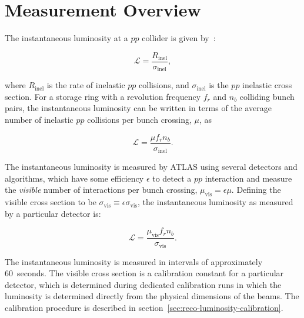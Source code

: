 
\section{Measurement Overview}\label{sec:luminosity-overview}
The instantaneous luminosity at a $pp$ collider is given by~\cite{Grafstrom:2015go,Aad:2013ucp}:

\begin{equation}
	\mathcal{L} = \frac{R_{\mathrm{inel}}}{\sigma_{\mathrm{inel}}},
\end{equation}

where $R_{\mathrm{inel}}$ is the rate of inelastic $pp$ collisions, and $\sigma_{\mathrm{inel}}$ is the $pp$ inelastic cross section. For a storage ring with a revolution frequency $f_r$ and $n_b$ colliding bunch pairs, the instantaneous luminosity can be written in terms of the average number of inelastic $pp$ collisions per bunch crossing, $\mu$, as 

\begin{equation}
	\mathcal{L} = \frac{\mu f_r n_b}{\sigma_{\mathrm{inel}}}.
\end{equation}

The instantaneous luminosity is measured by ATLAS using several detectors and algorithms, which have some efficiency $\epsilon$ to detect a $pp$ interaction and measure the \emph{visible} number of interactions per bunch crossing, $\mu_{\mathrm{vis}} = \epsilon \mu$. Defining the visible cross section to be $\sigma_{\mathrm{vis}}\equiv \epsilon \sigma_{\mathrm{vis}}$, the instantaneous luminosity as measured by a particular detector is:

\begin{equation}\label{eqn:reco-luminosity-detected}
	\mathcal{L} = \frac{\mu_{\mathrm{vis}} f_r n_b}{\sigma_{\mathrm{vis}}}.
\end{equation}

The instantaneous luminosity is measured in intervals of approximately 60~seconds. The visible cross section is a calibration constant for a particular detector, which is determined during dedicated calibration runs in which the luminosity is determined directly from the physical dimensions of the beams. The calibration procedure is described in section~\ref{sec:reco-luminosity-calibration}. 

